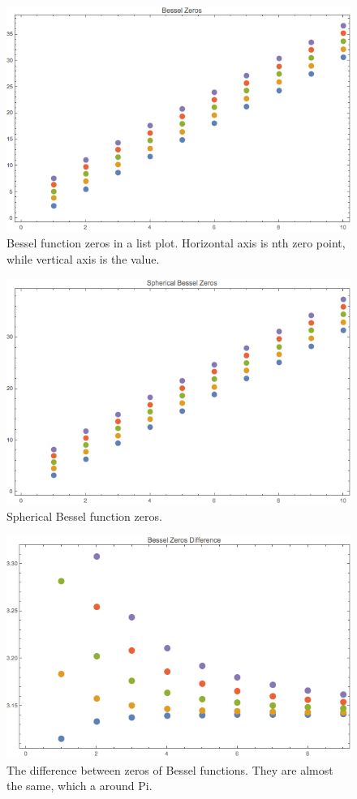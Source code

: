 \documentclass[letterpaper,10pt,english]{sphinxmanual}
\begin{document}
\begin{figure}[htbp]
\centering
\capstart

\includegraphics{besselZerosListPlt.png}
\caption{Bessel function zeros in a list plot. Horizontal axis is nth zero point, while vertical axis is the value.}\end{figure}
\begin{figure}[htbp]
\centering
\capstart

\includegraphics{sphbesselZerosListPlt.png}
\caption{Spherical Bessel function zeros.}\end{figure}
\begin{figure}[htbp]
\centering
\capstart

\includegraphics{besselZerosDifferencePlt.png}
\caption{The difference between zeros of Bessel functions. They are almost the same, which a around Pi.}\end{figure}
\end{document}
